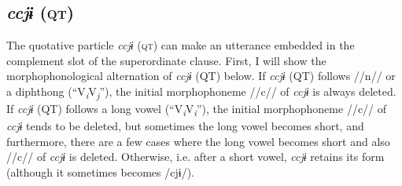 \subsection{\textit{ccjɨ} (\textsc{qt})}\label{sec:10.4.1}

The quotative particle \textit{ccjɨ} (\textsc{qt}) can make an utterance embedded in the complement slot of the superordinate clause. First, I will show the morphophonological alternation of \textit{ccjɨ} (QT) below. If \textit{ccjɨ} (QT) follows //n// or a diphthong (“V\textit{\textsubscript{i}}V\textit{\textsubscript{j}}”), the initial morphophoneme //c// of \textit{ccjɨ} is always deleted. If \textit{ccjɨ} (QT) follows a long vowel (“V\textit{\textsubscript{i}}V\textit{\textsubscript{i}}”), the initial morphophoneme //c// of \textit{ccjɨ} tends to be deleted, but sometimes the long vowel becomes short, and furthermore, there are a few cases where the long vowel becomes short and also //c// of \textit{ccjɨ} is deleted. Otherwise, i.e. after a short vowel, \textit{ccjɨ} retains its form (although it sometimes becomes /cjɨ/).

